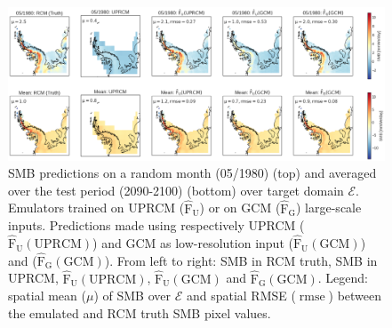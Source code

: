 \documentclass[a4paper,11pt,oneside]{report}
\begin{document}
\begin{figure}[thb]
  \centering
  \includegraphics[width=\columnwidth]{doc/Thesis-latex/images/results/geoplots_RCM_GCM.pdf}
  \caption []{\small SMB predictions on a random month (05/1980) (top) and averaged over the test period (2090-2100) (bottom) over target domain $\mathcal{E}$. Emulators trained on UPRCM ($\mathrm{\hat{F}_{U}}$) or on GCM ($\mathrm{\hat{F}_{G}}$) large-scale inputs. Predictions made using respectively UPRCM ($\mathrm{\hat{F}_{U}(UPRCM)}$) and GCM as low-resolution input ($\mathrm{\hat{F}_{U}(GCM)}$) and ($\mathrm{\hat{F}_{G}(GCM)}$). From left to right: SMB in RCM truth, SMB in UPRCM, $\operatorname{\hat{F}_{U}(UPRCM)}$, $\operatorname{\hat{F}_{U}(GCM)}$ and $\operatorname{\hat{F}_{G}(GCM)}$. Legend: spatial mean ($\mu$) of SMB over $\mathcal{E}$ and spatial RMSE ($\operatorname{rmse}$) between the emulated and RCM truth SMB pixel values.}
  \vspace{-3mm}
  \label{fig:geoplots-GCM-RCM}
\end{figure}
\end{document}
